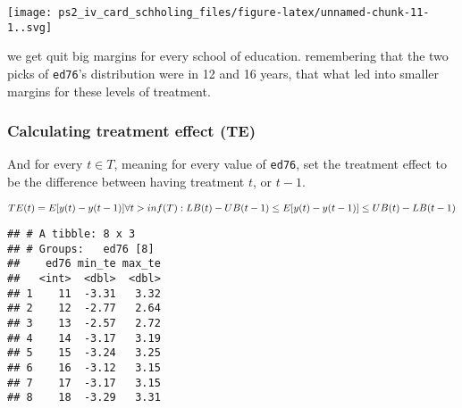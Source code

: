 \documentclass[
]{article}
\newenvironment{Shaded}{\begin{snugshade}}{\end{snugshade}}
\newcommand{\CommentTok}[1]{\textcolor[rgb]{0.56,0.35,0.01}{\textit{#1}}}
\newcommand{\ControlFlowTok}[1]{\textcolor[rgb]{0.13,0.29,0.53}{\textbf{#1}}}
\newcommand{\DecValTok}[1]{\textcolor[rgb]{0.00,0.00,0.81}{#1}}
\newcommand{\FunctionTok}[1]{\textcolor[rgb]{0.00,0.00,0.00}{#1}}
\newcommand{\NormalTok}[1]{#1}
\newcommand{\OtherTok}[1]{\textcolor[rgb]{0.56,0.35,0.01}{#1}}
\newcommand{\SpecialCharTok}[1]{\textcolor[rgb]{0.00,0.00,0.00}{#1}}
\newcommand{\StringTok}[1]{\textcolor[rgb]{0.31,0.60,0.02}{#1}}
\begin{document}
\texttt{[image: ps2\_iv\_card\_schholing\_files/figure-latex/unnamed-chunk-11-1..svg]}

we get quit big margins for every school of education. remembering that
the two picks of \texttt{ed76}'s distribution were in 12 and 16 years,
that what led into smaller margins for these levels of treatment.

\hypertarget{calculating-treatment-effect-te}{%
\subsubsection{Calculating treatment effect
(TE)}\label{calculating-treatment-effect-te}}

And for every \(t \in T\), meaning for every value of \texttt{ed76}, set
the treatment effect to be the difference between having treatment
\(t\), or \(t-1\).

\[
TE(t) = E[y(t) - y(t-1)] \\
\forall t > inf(T): \\
 LB(t) - UB(t-1) \le E[y(t) - y(t-1)] \le UB(t)- LB(t-1) 
\]

\begin{Shaded}
\end{Shaded}

\begin{verbatim}
## # A tibble: 8 x 3
## # Groups:   ed76 [8]
##    ed76 min_te max_te
##   <int>  <dbl>  <dbl>
## 1    11  -3.31   3.32
## 2    12  -2.77   2.64
## 3    13  -2.57   2.72
## 4    14  -3.17   3.19
## 5    15  -3.24   3.25
## 6    16  -3.12   3.15
## 7    17  -3.17   3.15
## 8    18  -3.29   3.31
\end{verbatim}
\end{document}
